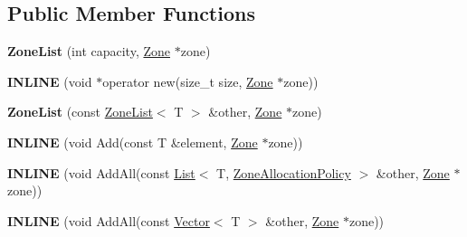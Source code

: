 \subsection*{Public Member Functions}
\begin{DoxyCompactItemize}
\item 
\hypertarget{classv8_1_1internal_1_1_zone_list_af1f7621b6c2be40916af5fc5a46ce517}{}{\bfseries Zone\+List} (int capacity, \hyperlink{classv8_1_1internal_1_1_zone}{Zone} $\ast$zone)\label{classv8_1_1internal_1_1_zone_list_af1f7621b6c2be40916af5fc5a46ce517}

\item 
\hypertarget{classv8_1_1internal_1_1_zone_list_acc34dc27f9813277415c5c9ceafe696d}{}{\bfseries I\+N\+L\+I\+N\+E} (void $\ast$operator new(size\+\_\+t size, \hyperlink{classv8_1_1internal_1_1_zone}{Zone} $\ast$zone))\label{classv8_1_1internal_1_1_zone_list_acc34dc27f9813277415c5c9ceafe696d}

\item 
\hypertarget{classv8_1_1internal_1_1_zone_list_adebcf6abb4a1df45ad36a8dadc8be12b}{}{\bfseries Zone\+List} (const \hyperlink{classv8_1_1internal_1_1_zone_list}{Zone\+List}$<$ T $>$ \&other, \hyperlink{classv8_1_1internal_1_1_zone}{Zone} $\ast$zone)\label{classv8_1_1internal_1_1_zone_list_adebcf6abb4a1df45ad36a8dadc8be12b}

\item 
\hypertarget{classv8_1_1internal_1_1_zone_list_a885aee1fce2450a997a691a6822d2e1e}{}{\bfseries I\+N\+L\+I\+N\+E} (void Add(const T \&element, \hyperlink{classv8_1_1internal_1_1_zone}{Zone} $\ast$zone))\label{classv8_1_1internal_1_1_zone_list_a885aee1fce2450a997a691a6822d2e1e}

\item 
\hypertarget{classv8_1_1internal_1_1_zone_list_a78494a4004d058b075776c5c70f361b6}{}{\bfseries I\+N\+L\+I\+N\+E} (void Add\+All(const \hyperlink{classv8_1_1internal_1_1_list}{List}$<$ T, \hyperlink{structv8_1_1internal_1_1_zone_allocation_policy}{Zone\+Allocation\+Policy} $>$ \&other, \hyperlink{classv8_1_1internal_1_1_zone}{Zone} $\ast$zone))\label{classv8_1_1internal_1_1_zone_list_a78494a4004d058b075776c5c70f361b6}

\item 
\hypertarget{classv8_1_1internal_1_1_zone_list_a1df2db59c892cec985ca41d225b1c9eb}{}{\bfseries I\+N\+L\+I\+N\+E} (void Add\+All(const \hyperlink{classv8_1_1internal_1_1_vector}{Vector}$<$ T $>$ \&other, \hyperlink{classv8_1_1internal_1_1_zone}{Zone} $\ast$zone))\label{classv8_1_1internal_1_1_zone_list_a1df2db59c892cec985ca41d225b1c9eb}


\end{DoxyCompactItemize}
